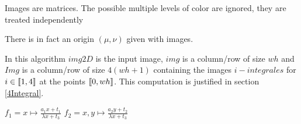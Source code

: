 


Images are matrices. The possible multiple levels of color are ignored, they are treated independently

There is in fact an origin $(\mu,\nu)$ given with images.



In this algorithm $img2D$ is the input image, $img$ is a column/row of size $wh$ and $Img$ is a column/row of size $4(wh+1)$ containing the images $i-integrales$ for $i\in \llbracket 1,4 \rrbracket $ at the points $\llbracket 0,wh \rrbracket$. This computation is justified in section \ref{4Integral}.



\begin{algorithm}[H]
\caption{$applyHomography(img,imgf,H)$}
$f_1 = x\mapsto \frac{a_1x + t_1}{\lambda x + t_3}$ \;
$f_2 = x,y\mapsto \frac{a_2y + t_2}{\lambda x + t_3}$ \;

\end{algorithm}


